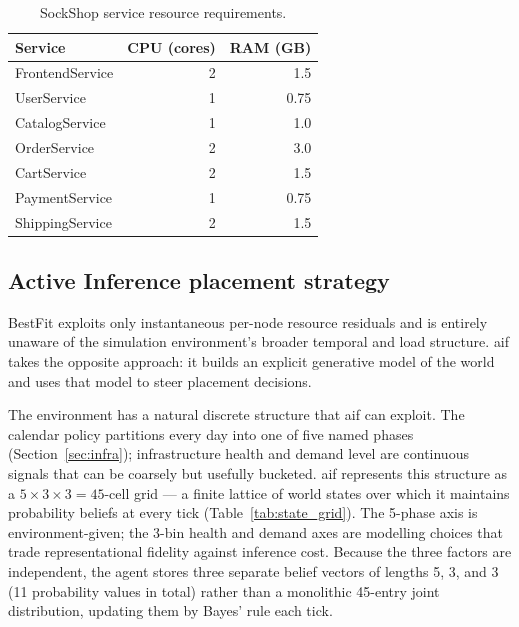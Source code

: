 \documentclass[11pt, a4paper]{article}
\begin{document}
\begin{table}[ht]
\centering
\caption{SockShop service resource requirements.}
\label{tab:service_reqs}
\begin{tabular}{lrr}
\toprule
\textbf{Service} & \textbf{CPU (cores)} & \textbf{RAM (GB)} \\
\midrule
FrontendService  & 2 & 1.5 \\
UserService      & 1 & 0.75 \\
CatalogService   & 1 & 1.0 \\
OrderService     & 2 & 3.0 \\
CartService      & 2 & 1.5 \\
PaymentService   & 1 & 0.75 \\
ShippingService  & 2 & 1.5 \\
\bottomrule
\end{tabular}
\end{table}

\subsection{Active Inference placement strategy}
\label{sec:aif}

BestFit exploits only instantaneous per-node resource residuals and is
entirely unaware of the simulation environment's broader temporal and load
structure.
\gls{aif} takes the opposite approach: it builds an explicit generative model
of the world and uses that model to steer placement decisions.

The environment has a natural discrete structure that \gls{aif} can exploit.
The calendar policy partitions every day into one of five named phases
(Section~\ref{sec:infra}); infrastructure health and demand level are
continuous signals that can be coarsely but usefully bucketed.
\gls{aif} represents this structure as a $5\times3\times3=45$-cell grid ---
a finite lattice of world states over which it maintains probability beliefs
at every tick (Table~\ref{tab:state_grid}).
The 5-phase axis is environment-given; the 3-bin health and demand axes are
modelling choices that trade representational fidelity against inference cost.
Because the three factors are independent, the agent stores three separate
belief vectors of lengths 5, 3, and 3 (11 probability values in total)
rather than a monolithic 45-entry joint distribution, updating them by
Bayes' rule each tick.
\end{document}
